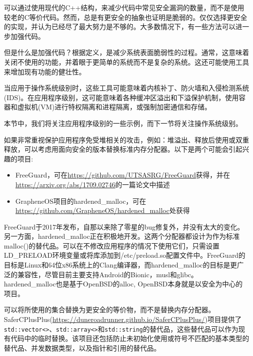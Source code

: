 可以通过使用现代的C++结构，来减少代码中常见安全漏洞的数量，而不是使用较老的C等价代码。然而，总是有更安全的抽象也证明是脆弱的。仅仅选择更安全的实现，并认为已经尽了最大努力是不够的。大多数情况下，有一些方法可以进一步加强代码。

但是什么是加强代码？根据定义，是减少系统表面脆弱性的过程。通常，这意味着关闭不使用的功能，并着眼于更简单的系统而不是复杂的系统。这还可能使用工具来增加现有功能的健壮性。

当应用于操作系统级别时，这些工具可能意味着内核补丁、防火墙和入侵检测系统(IDS)。在应用程序级别，这可能意味着各种缓冲区溢出和下溢保护机制，使用容器和虚拟机(VM)进行特权隔离和进程隔离，或强制加密通信和存储。

本节中，我们将关注应用程序级别的一些示例，而下一节将关注操作系统级别。


如果非常重视保护应用程序免受堆相关的攻击，例如：堆溢出、释放后使用或双重释放，可以考虑用面向安全的版本替换标准内存分配器。以下是两个可能会引起兴趣的项目:

\begin{itemize}
\item 
FreeGuard，可在\url{https://github.com/UTSASRG/FreeGuard}获得，并在\url{https://arxiv.org/abs/1709.02746}的一篇论文中描述

\item 
GrapheneOS项目的hardened\_malloc，可在\url{https://github.com/GrapheneOS/hardened\_malloc}处获得
\end{itemize}

FreeGuard于2017年发布，自那以来除了零星的bug修复外，并没有太大的变化。另一方面，hardened\_malloc正在积极地开发。这两个分配器都设计为作为标准malloc()的替代品。可以在不修改应用程序的情况下使用它们，只需设置LD\_PRELOAD环境变量或将库添加到/etc/preload.so配置文件中。FreeGuard的目标是Linux和64位x86系统上的Clang编译器，而hardened\_malloc的目标是更广泛的兼容性，尽管目前主要支持Android的Bionic，musl和glibc。hardened\_malloc也是基于OpenBSD的alloc, OpenBSD本身就是以安全为中心的项目。

可以将所使用的集合替换为更安全的等价物，而不是替换内存分配器。SaferCPlusPlus(\url{https://duneroadrunner.github.io/SaferCPlusPlus/})项目提供了\texttt{std::vector<>}、\texttt{std::array<>}和\texttt{std::string}的替代品，这些替代品可以作为现有代码中的临时替换。该项目还包括防止未初始化使用或符号不匹配的基本类型的替代品、并发数据类型，以及指针和引用的替代品。


